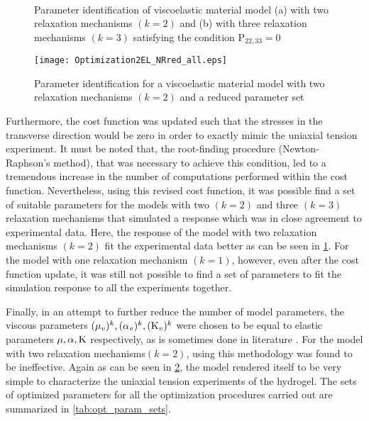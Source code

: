\begin{figure}[htpb]
    \centering
     \label{fig:parameter_optimization_nr_2EL} 
     \label{fig:parameter_optimization_nr_3EL}\\
    \caption[Parameter identification 3]{Parameter identification of viscoelastic material model (a) with two relaxation mechanisms \((k=2)\) and (b) with three relaxation mechanisms \((k=3)\) satisfying the condition \(\mathrm{P}_{22,33} = 0\)}
    \label{fig:parameter_optimization_nr}
\end{figure}


\begin{figure}[htbp]
    \centering
    \texttt{[image: Optimization2EL\_NRred\_all.eps]}
    \caption[Parameter identification 4]{Parameter identification for a viscoelastic material model with two relaxation mechanisms \((k=2)\) and a reduced parameter set}%
    \label{fig:parameter_optimization_red}
\end{figure}

Furthermore, the cost function was updated such that the stresses in the transverse direction would be zero in order to exactly mimic the uniaxial tension experiment. It must be noted that, the root-finding procedure (Newton-Raphson's method), that was necessary to achieve this condition, led to a tremendous increase in the number of computations performed within the cost function. Nevertheless, using this revised cost function, it was possible find a set of suitable parameters for the models with two \((k=2)\) and three \((k=3)\) relaxation mechanisms that simulated a response which was in close agreement to experimental data. Here, the response of the model with two relaxation mechanisms \((k=2)\) fit the experimental data better as can be seen in \cref{fig:parameter_optimization_nr}. For the model with one relaxation mechanism \((k=1)\), however, even after the cost function update, it was still not possible to find a set of parameters to fit the simulation response to all the experiments together. 

Finally, in an attempt to further reduce the number of model parameters, the viscous parameters \((\mu_{v})^{k}, (\alpha_{v}{})^{k}, (\mathrm{K}_{v}{})^{k}\) were chosen to be equal to elastic parameters \(\mu, \alpha, \mathrm{K}\) respectively, as is sometimes done in literature \cite[][see Sec. 5]{Reese1998Sep}. For the model with two relaxation mechanisms\((k=2)\), using this methodology was found to be ineffective. Again as can be seen in \cref{fig:parameter_optimization_red}, the model rendered itself to be very simple to characterize the uniaxial tension experiments of the hydrogel. The sets of optimized parameters for all the optimization procedures carried out are summarized in \cref{tab:opt_param_sets}.

